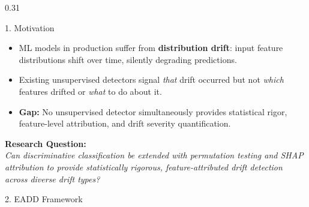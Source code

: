 \documentclass[final]{beamer}
\begin{document}
\begin{frame}[t]
\vskip1cm

\begin{columns}[t]

\begin{column}{0.31\textwidth}

\begin{block}{1. Motivation}
\begin{itemize}
  \item ML models in production suffer from \textbf{distribution drift}: input feature distributions shift over time, silently degrading predictions.
  \item Existing unsupervised detectors signal \textit{that} drift occurred but not \textit{which} features drifted or \textit{what} to do about it.
  \item \textbf{Gap:} No unsupervised detector simultaneously provides statistical rigor, feature-level attribution, and drift severity quantification.
\end{itemize}
\vskip0.5cm
{\color{MahidolBlue}\large\bfseries Research Question:}\\[6pt]
\textit{Can discriminative classification be extended with permutation testing and SHAP attribution to provide statistically rigorous, feature-attributed drift detection across diverse drift types?}
\end{block}

\vskip1cm

\begin{block}{2. EADD Framework}


\end{block}
\end{column}
\end{columns}
\end{frame}
\end{document}
